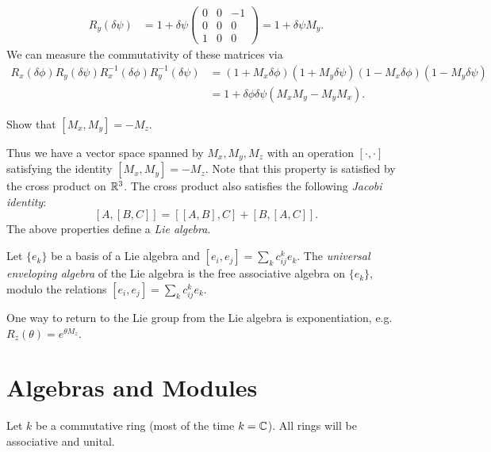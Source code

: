 \begin{example}
\begin{align*}
    R_y(\delta \psi)
    &= 1 + \delta \psi \begin{pmatrix}
      0 & 0 & -1 \\
      0 & 0 & 0 \\
      1 & 0 & 0
    \end{pmatrix} = 1 + \delta \psi M_y.
  \end{align*}
  We can measure the commutativity of these
  matrices via
  \begin{align*}
    R_x(\delta \phi) R_y(\delta \psi)
    R_x^{-1}(\delta \phi)
    R_y^{-1}(\delta \psi)
    &= (1 + M_x \delta \phi)
    (1 + M_y \delta \psi)
    (1 - M_x \delta \phi)
    (1 - M_y \delta \psi) \\
    &= 1 + \delta \phi \delta \psi (M_x M_y - M_y M_x).
  \end{align*}
\end{example}

\begin{exercise}
  Show that $[M_x, M_y] = -M_z$.
\end{exercise}

\begin{remark}
  Thus we have a vector space spanned by
  $M_x, M_y, M_z$ with an operation
  $[\cdot, \cdot]$ satisfying the identity
  $[M_x, M_y] = -M_z$. Note that this property
  is satisfied by the cross product on $\mathbb{R}^3$.
  The cross product also satisfies the
  following
  \emph{Jacobi identity}:
  \[
    [A, [B, C]] = [[A, B], C] + [B, [A, C]].
  \]
  The above properties define a
  \emph{Lie algebra}.
\end{remark}

\begin{definition}
  Let $\{e_k\}$ be a basis of a Lie algebra
  and $[e_i, e_j] = \sum_k c_{ij}^k e_k$.
  The \emph{universal enveloping algebra}
  of the Lie algebra is the free associative
  algebra on $\{e_k\}$, modulo the
  relations $[e_i, e_j] = \sum_k c_{ij}^k e_k$.
\end{definition}

\begin{remark}
  One way to return to the Lie group from
  the Lie algebra is exponentiation, e.g.
  $R_z(\theta) = e^{\theta M_z}$.
\end{remark}

\section{Algebras and Modules}

Let $k$ be a commutative ring (most of the time
$k = \mathbb{C}$). All rings will be associative and
unital.

